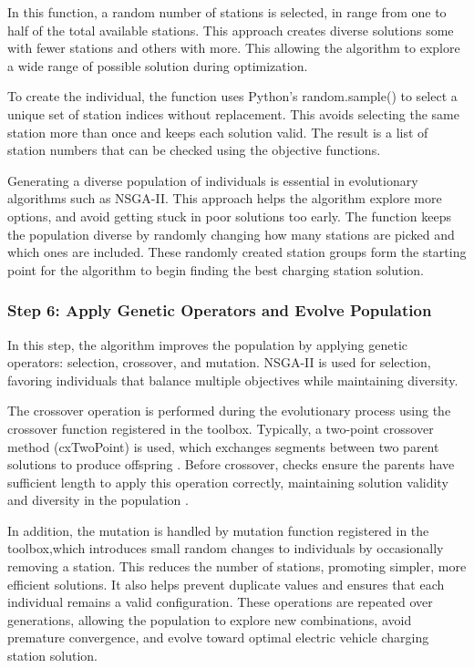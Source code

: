 In this function, a random number of stations is selected, in range from one to half of the total available stations. This approach creates diverse solutions some with fewer stations and others with more. This allowing the algorithm to explore a wide range of possible solution during optimization.


To create the individual, the function uses Python’s random.sample() to select a unique set of station indices without replacement. This avoids selecting the same station more than once and keeps each solution valid. The result is a list of station numbers that can be checked using the objective functions.


Generating a diverse population of individuals is essential in evolutionary algorithms such as NSGA-II\cite{Introduction to evolutionary computing. Springer}. This approach helps the algorithm explore more options, and avoid getting stuck in poor solutions too early. The function keeps the population diverse by randomly changing how many stations are picked and which ones are included. These randomly created station groups form the starting point for the algorithm to begin finding the best charging station solution.


\subsubsection*{Step 6: Apply Genetic Operators and Evolve Population}

In this step, the algorithm improves the population by applying genetic operators: selection, crossover, and mutation. NSGA-II is used for selection, favoring individuals that balance multiple objectives while maintaining diversity\cite{A Fast and Elitist Multi-objective Genetic Algorithm: NSGA-II}. 


The crossover operation is performed during the evolutionary process using the crossover function registered in the toolbox. Typically, a two-point crossover method (cxTwoPoint) is used, which exchanges segments between two parent solutions to produce offspring \cite{Introduction to evolutionary computing. Springer}. Before crossover, checks ensure the parents have sufficient length to apply this operation correctly, maintaining solution validity and diversity in the population \cite{Introduction to evolutionary computing. Springer}. 

In addition, the mutation is handled by mutation function registered in the toolbox,which introduces small random changes to individuals by occasionally removing a station. This reduces the number of stations, promoting simpler, more efficient solutions. It also helps prevent duplicate values and ensures that each individual remains a valid configuration\cite{Introduction to evolutionary computing. Springer}. These operations are repeated over generations, allowing the population to explore new combinations, avoid premature convergence, and evolve toward optimal\cite{Introduction to evolutionary computing. Springer} electric vehicle charging station solution.

